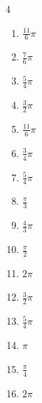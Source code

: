 \begin{multicols}{4}
\begin{enumerate}
  \item $\displaystyle \frac{11}{6}\pi$

  \item $\displaystyle \frac{7}{6}\pi$

  \item $\displaystyle \frac{5}{4}\pi$

  \item $\displaystyle \frac{3}{2}\pi$

  \item $\displaystyle \frac{11}{6}\pi$

  \item $\displaystyle \frac{3}{4}\pi$

  \item $\displaystyle \frac{5}{4}\pi$

  \item $\displaystyle \frac{\pi}{3}$

\columnbreak %

  \item $\displaystyle \frac{4}{3}\pi$

  \item $\displaystyle \frac{\pi}{2}$

  \item $\displaystyle 2\pi$

  \item $\displaystyle \frac{3}{2}\pi$

  \item $\displaystyle \frac{5}{4}\pi$

  \item $\displaystyle \pi$

  \item $\displaystyle \frac{\pi}{4}$

  \item $\displaystyle 2\pi$


\end{enumerate}
\end{multicols}
